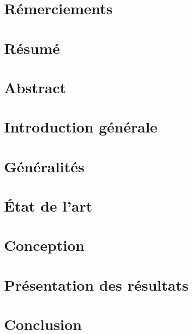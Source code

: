 \documentclass[
		oneside,numbers=noenddot,headinclude,
	 	footinclude=true,cleardoublepage=empty,
		dottedtoc,paper=a4,fontsize=12pt,
        utf8,
]{scrreport}
\begin{document}
    \setcounter{chapter}{-1}
    

    \chapter*{Rémerciements}\label{cha:remerciements}
    

    \chapter*{Résumé}\label{cha:resume}
    

    \chapter*{Abstract}\label{cha:abstract}
    

    \tableofcontents

    \listoffigures

    \listoftables

    \chapter{Introduction générale}\label{cha:introduction-generale}
    

    \chapter{Généralités}\label{cha:generalites}
    

    \chapter{État de l'art}\label{cha:etat-de-l-art}
    

    \chapter{Conception}\label{sec:conception}
    

    \chapter{Présentation des résultats}\label{cha:presentation-des-resultats}
    

    \chapter*{Conclusion}\label{cha:conlusion}
    

    \printbibliography
\end{document}
